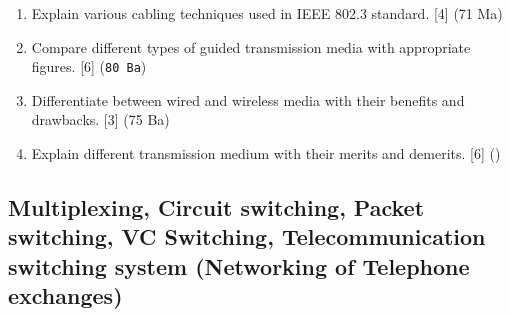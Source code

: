 \documentclass[12pt]{article}
\begin{document}
\begin{enumerate}[noitemsep, topsep=0pt]
    		\item Explain various cabling techniques used in IEEE 802.3 standard. \hfill [4] (71 Ma)
    
    		\item Compare different types of guided transmission media with appropriate figures. \hfill [6] (\texttt{80 Ba})
    		
    		\item Differentiate between wired and wireless media with their benefits and drawbacks. \hfill [3] (75 Ba)
    
    		\item Explain different transmission medium with their merits and demerits. \hfill [6] ()
		\end{enumerate}

	\subsection{Multiplexing, Circuit switching, Packet switching, VC Switching, Telecommunication switching system (Networking of Telephone exchanges)}
\end{document}
